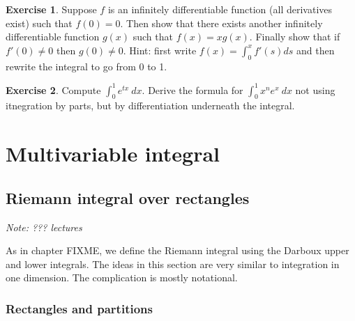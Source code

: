 \documentclass[12pt]{book}
\newcommand{\sectionnotes}[1]{\noindent \emph{Note: #1} \medskip \par}
\theoremstyle{plain}
\theoremstyle{remark}
\theoremstyle{definition}
\theoremstyle{exercise}
\newtheorem{exercise}{Exercise}[section]
\theoremstyle{example}
\begin{document}
\begin{exercise}
Suppose $f$ is an infinitely differentiable function (all derivatives exist)
such that $f(0) = 0$.  Then show that there exists another infinitely
differentiable function $g(x)$ such that $f(x) = xg(x)$.  Finally show that
if $f'(0) \not= 0$ then $g(0) \not= 0$.  Hint: first write
$f(x) = \int_0^x f'(s) ds$ and then rewrite the integral to go from $0$ to
1.
\end{exercise}


\begin{exercise}
Compute $\int_0^1 e^{tx} ~dx$.  Derive the formula for
$\int_0^1 x^n e^{x} ~dx$ not using itnegration by parts, but
by differentiation underneath the integral.
\end{exercise}





\chapter{Multivariable integral} \label{mi:chapter}



\section{Riemann integral over rectangles}
\label{sec:rirect}

\sectionnotes{??? lectures}

As in chapter FIXME, we define the Riemann integral using the Darboux
upper and lower integrals.  The ideas in this section are very similar to
integration in one dimension.  The complication is mostly notational.

\subsection{Rectangles and partitions}
\end{document}

